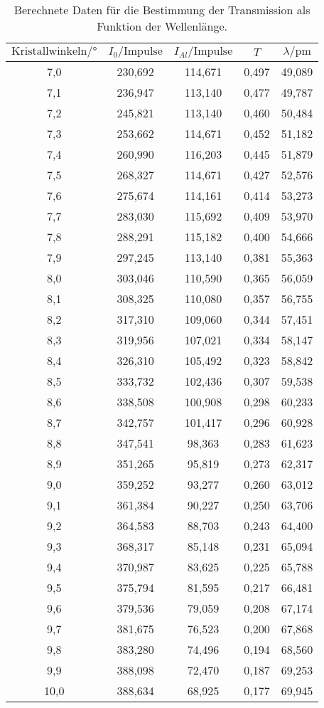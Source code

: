 \begin{table}
  \centering
  \caption{Berechnete Daten für die Bestimmung der Transmission als Funktion der Wellenlänge.}
  \label{tab:some_data1}
  \begin{tabular}{ccccc}
    \toprule
    $\text{Kristallwinkeln} /\mathrm{°}$ & $I_{0} /\mathrm{Impulse}$  & $I_{Al} /\mathrm{ Impulse} $ & $T $ & $ \lambda  /\mathrm{pm}$\\
    \midrule 
7,0 & 230,692 & 114,671 & 0,497 & 49,089 \\
7,1 & 236,947 & 113,140 & 0,477 & 49,787 \\
7,2 & 245,821 & 113,140 & 0,460 & 50,484 \\
7,3 & 253,662 & 114,671 & 0,452 & 51,182 \\
7,4 & 260,990 & 116,203 & 0,445 & 51,879 \\
7,5 & 268,327 & 114,671 & 0,427 & 52,576 \\
7,6 & 275,674 & 114,161 & 0,414 & 53,273 \\
7,7 & 283,030 & 115,692 & 0,409 & 53,970 \\
7,8 & 288,291 & 115,182 & 0,400 & 54,666 \\
7,9 & 297,245 & 113,140 & 0,381 & 55,363 \\
8,0 & 303,046 & 110,590 & 0,365 & 56,059 \\
8,1 & 308,325 & 110,080 & 0,357 & 56,755 \\
8,2 & 317,310 & 109,060 & 0,344 & 57,451 \\
8,3 & 319,956 & 107,021 & 0,334 & 58,147 \\
8,4 & 326,310 & 105,492 & 0,323 & 58,842 \\
8,5 & 333,732 & 102,436 & 0,307 & 59,538 \\
8,6 & 338,508 & 100,908 & 0,298 & 60,233 \\
8,7 & 342,757 & 101,417 & 0,296 & 60,928 \\
8,8 & 347,541 & 98,363 & 0,283 & 61,623 \\
8,9 & 351,265 & 95,819 & 0,273 & 62,317 \\
9,0 & 359,252 & 93,277 & 0,260 & 63,012 \\
9,1 & 361,384 & 90,227 & 0,250 & 63,706 \\
9,2 & 364,583 & 88,703 & 0,243 & 64,400 \\
9,3 & 368,317 & 85,148 & 0,231 & 65,094 \\
9,4 & 370,987 & 83,625 & 0,225 & 65,788 \\
9,5 & 375,794 & 81,595 & 0,217 & 66,481 \\
9,6 & 379,536 & 79,059 & 0,208 & 67,174 \\
9,7 & 381,675 & 76,523 & 0,200 & 67,868 \\
9,8 & 383,280 & 74,496 & 0,194 & 68,560 \\
9,9 & 388,098 & 72,470 & 0,187 & 69,253 \\
10,0 & 388,634 & 68,925 & 0,177 & 69,945 \\
    \bottomrule
  \end{tabular}
\end{table}





